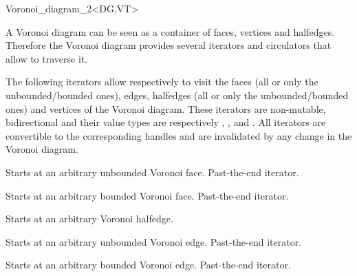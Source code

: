 \begin{ccRefClass}{Voronoi_diagram_2<DG,VT>}


A Voronoi diagram can be seen as a container of faces, vertices and
halfedges. Therefore the Voronoi diagram provides several iterators
and circulators that allow to traverse it.





The following iterators allow respectively to visit the faces (all or
only the unbounded/bounded ones), edges, halfedges (all or only the
unbounded/bounded ones) and vertices of the Voronoi diagram. These
iterators are non-mutable, bidirectional and their 
value types are respectively , ,
 and . All iterators are convertible to the
corresponding handles and are invalidated by any change in the Voronoi
diagram.

\ccGlue
{}

{Starts at an arbitrary unbounded Voronoi face.}
\ccGlue
{}
{Past-the-end iterator.}

{Starts at an arbitrary bounded Voronoi face.}
\ccGlue
{}
{Past-the-end iterator.}

\ccGlue
{}

{Starts at an arbitrary Voronoi halfedge.}
\ccGlue
{}

{Starts at an arbitrary unbounded Voronoi edge.}
\ccGlue
{}
{Past-the-end iterator.}

{Starts at an arbitrary bounded Voronoi edge.}
\ccGlue
{}
{Past-the-end iterator.}


\end{ccRefClass}

